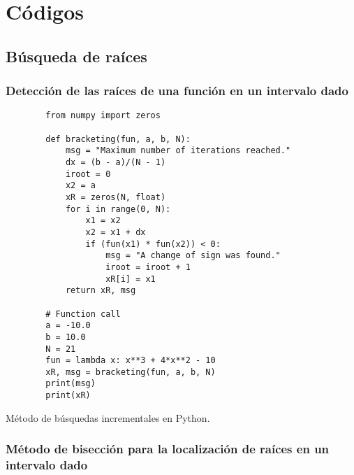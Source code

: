 \graphicspath{{img/algor/}}
\chapter{Códigos}


\section{Búsqueda de raíces}

\subsection{Detección de las raíces de una función en un intervalo dado}


\begin{listing}[H]
    \begin{verbatim}
        from numpy import zeros
        
        def bracketing(fun, a, b, N):
            msg = "Maximum number of iterations reached."
            dx = (b - a)/(N - 1)
            iroot = 0
            x2 = a
            xR = zeros(N, float)
            for i in range(0, N):
                x1 = x2
                x2 = x1 + dx
                if (fun(x1) * fun(x2)) < 0:
                    msg = "A change of sign was found."
                    iroot = iroot + 1
                    xR[i] = x1
            return xR, msg

        # Function call
        a = -10.0
        b = 10.0
        N = 21
        fun = lambda x: x**3 + 4*x**2 - 10
        xR, msg = bracketing(fun, a, b, N)
        print(msg)
        print(xR)
    \end{verbatim}
    \caption{Método de búsquedas incrementales en Python.}
    \label{lst:bracketing}
\end{listing}


\subsection{Método de bisección para la localización de raíces en un intervalo 
dado}

